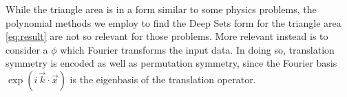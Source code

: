 \documentclass[10pt]{article}
\newcommand{\CH}[1]{{\color{blue} (CH says: #1)}}
\begin{document}
% 
While the triangle area is in a form similar to some physics problems, the polynomial methods we employ to find the Deep Sets form for the triangle area \eqref{eq:result} are not so relevant for those problems.
More relevant instead is to consider a $\phi$ which Fourier transforms the input data.
In doing so, translation symmetry is encoded as well as permutation symmetry, since the Fourier basis $\exp (i\, \vec{k}\cdot\vec{x})$ is the eigenbasis of the translation operator.
\end{document}
